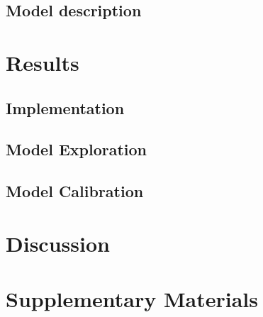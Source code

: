 




\subsection{Model description}






\section{Results}

\subsection{Implementation}


\subsection{Model Exploration}



\subsection{Model Calibration}




\section{Discussion}







\section{Supplementary Materials}


